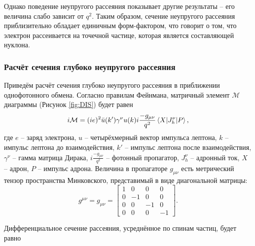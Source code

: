 \documentclass{extarticle}
\begin{document}
Однако поведение неупругого рассеяния показывает другие результаты -- его величина слабо зависит от $q^2$. Таким образом, сечение неупругого рассеяния приблизительно обладает единичным форм-фактором, что говорит о том, что электрон рассеивается на точечной частице, которая является составляющей нуклона.

\subsubsection{Расчёт сечения глубоко неупругого рассеяния}

Приведём расчёт сечения глубоко неупругого рассеяния в приближении однофотонного обмена. Согласно правилам Фейнмана, матричный элемент $\mathcal{M}$ диаграммы (Рисунок \ref{fig:DIS}) будет равен
\begin{equation}
	i\mathcal{M} = (ie)^2 \bar{u}(k')\gamma^\nu u(k) i \frac{-g_{\mu\nu}}{q^2} \braket{X | J_h^\nu | P},
\end{equation}
где $e$ -- заряд электрона, $u$ -- четырёхмерный вектор импульса лептона, $k$ -- импульс лептона до взаимодействия, $k'$ -- импульс лептона после взаимодействия, $\gamma^\nu$ -- гамма матрица Дирака, $i \frac{-g_{\mu\nu}}{q^2}$ -- фотонный пропагатор, $ J_h^\nu $ -- адронный ток, $X$ -- адрон, $P$ -- импульс адрона. Величина в пропагаторе $g_{\mu\nu}$ есть метрический тензор пространства Минковского, представимый в виде диагональной матрицы:
\begin{equation}
	g^{\mu\nu} = g_{\mu\nu} = \begin{bmatrix} 1&0&0&0\\0&-1&0&0\\0&0&-1&0\\0&0&0&-1 \end{bmatrix}.
\end{equation}

Дифференциальное сечение рассеяния, усреднённое по спинам частиц, будет равно
\end{document}

